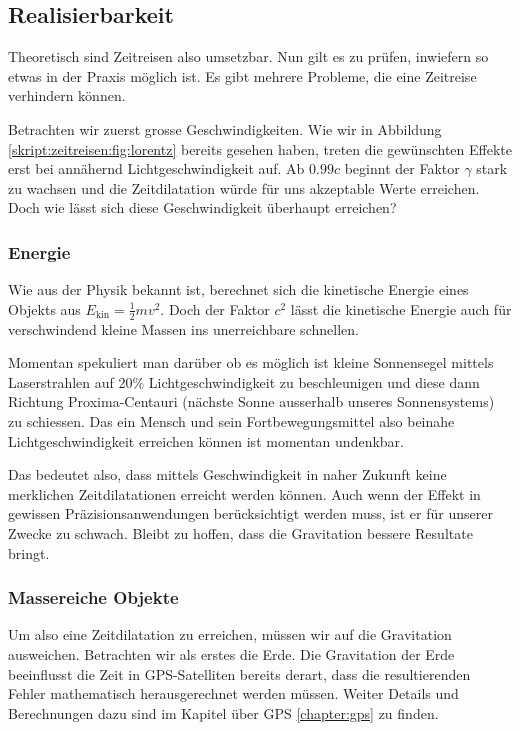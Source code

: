 \begin{refsection}
	\section{Realisierbarkeit}
    Theoretisch sind Zeitreisen also umsetzbar. Nun gilt es zu prüfen, inwiefern so etwas in der Praxis möglich ist. Es gibt mehrere Probleme, die eine Zeitreise verhindern können.
    
    Betrachten wir zuerst grosse Geschwindigkeiten. Wie wir in Abbildung \ref{skript:zeitreisen:fig:lorentz} bereits gesehen haben, treten die gewünschten Effekte erst bei annähernd Lichtgeschwindigkeit auf. Ab $0.99c$ beginnt der Faktor $\gamma$ stark zu wachsen und die Zeitdilatation würde für uns akzeptable Werte erreichen.
    Doch wie lässt sich diese Geschwindigkeit überhaupt erreichen?
    
    \subsubsection{Energie}\label{skript:chapters:zrirtreisen:energie}
    Wie aus der Physik bekannt ist, berechnet sich die kinetische Energie eines Objekts aus $E_{\text{kin}}=\frac{1}{2}mv^2$. Doch der Faktor $c^2$ lässt die kinetische Energie auch für verschwindend kleine Massen ins unerreichbare schnellen.
    
    Momentan spekuliert man darüber ob es möglich ist kleine Sonnensegel mittels Laserstrahlen auf 20\% Lichtgeschwindigkeit zu beschleunigen und diese dann Richtung Proxima-Centauri (nächste Sonne ausserhalb unseres Sonnensystems) zu schiessen. Das ein Mensch und sein Fortbewegungsmittel also beinahe Lichtgeschwindigkeit erreichen können ist momentan undenkbar.
    
    Das bedeutet also, dass mittels Geschwindigkeit in naher Zukunft keine merklichen Zeitdilatationen erreicht werden können. Auch wenn der Effekt in gewissen Präzisionsanwendungen berücksichtigt werden muss, ist er für unserer Zwecke zu schwach. Bleibt zu hoffen, dass die Gravitation bessere Resultate bringt. 
    
    \subsubsection{Massereiche Objekte}
    Um also eine Zeitdilatation zu erreichen, müssen wir auf die Gravitation ausweichen. Betrachten wir als erstes die Erde. Die Gravitation der Erde beeinflusst die Zeit in GPS-Satelliten bereits derart, dass die resultierenden Fehler mathematisch herausgerechnet werden müssen. Weiter Details und Berechnungen dazu sind im Kapitel über GPS \ref{chapter:gps} zu finden. %
    

\end{refsection}

